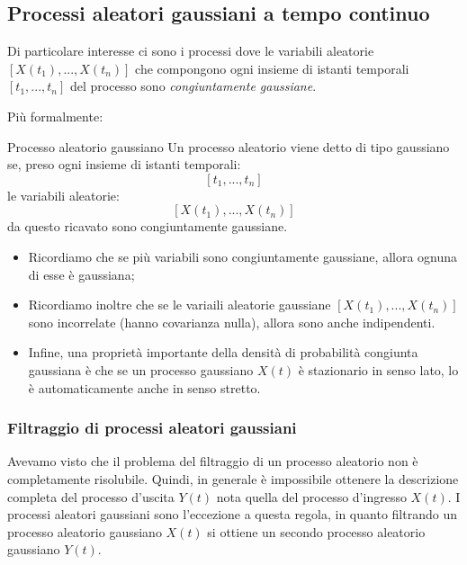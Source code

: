 \documentclass[a4paper,11pt]{article}
\begin{document}
\subsection{Processi aleatori gaussiani a tempo continuo}
Di particolare interesse ci sono i processi dove le variabili aleatorie $[X(t_1), ..., X(t_n)]$ che compongono ogni insieme di istanti temporali $[t_1, ..., t_n]$ del processo sono \textit{congiuntamente gaussiane}.

Più formalmente:
\begin{definition}{Processo aleatorio gaussiano}
Un processo aleatorio viene detto di tipo gaussiano se, preso ogni insieme di istanti temporali:
$$[t_1, ..., t_n]$$
le variabili aleatorie:
$$[X(t_1), ..., X(t_n)]$$
da questo ricavato sono congiuntamente gaussiane.
\end{definition}

\begin{itemize}
\item Ricordiamo che se più variabili sono congiuntamente gaussiane, allora ognuna di esse è gaussiana;
\item Ricordiamo inoltre che se le variaili aleatorie gaussiane $[X(t_1), ..., X(t_n)]$ sono incorrelate (hanno covarianza nulla), allora sono anche indipendenti. 
\item Infine, una proprietà importante della densità di probabilità congiunta gaussiana è che se un processo gaussiano $X(t)$ è stazionario in senso lato, lo è automaticamente anche in senso stretto.
\end{itemize}

\subsubsection{Filtraggio di processi aleatori gaussiani}
Avevamo visto che il problema del filtraggio di un processo aleatorio non è completamente risolubile. Quindi, in generale è impossibile ottenere la descrizione completa del processo d’uscita $Y(t)$ nota quella del processo d’ingresso $X(t)$. I processi aleatori gaussiani sono l'eccezione a questa regola, in quanto filtrando un processo aleatorio gaussiano $X(t)$ si ottiene un secondo processo aleatorio gaussiano $Y(t)$.
\end{document}
